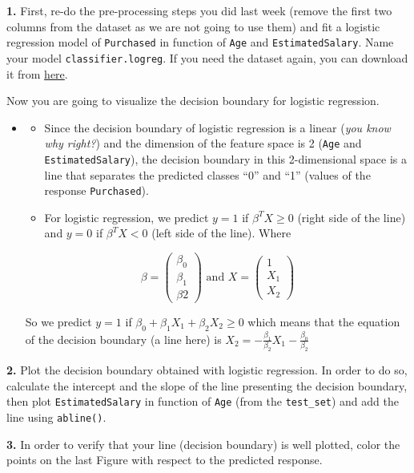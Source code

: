 \documentclass[]{book}
\providecommand{\tightlist}{%
  \setlength{\itemsep}{0pt}\setlength{\parskip}{0pt}}
\newenvironment{rmdblock}[1]
  {\begin{shaded*}
  \begin{itemize}
  \renewcommand{\labelitemi}{
    \raisebox{-.7\height}[0pt][0pt]{
      {\setkeys{Gin}{width=2em,keepaspectratio}\texttt{[image: img/icons/\#1]}}
    }
  }
  \item
  }
  {
  \end{itemize}
  \end{shaded*}
  }
\newenvironment{rmdinsight}
  {\begin{rmdblock}{insight}}
  {\end{rmdblock}}
\begin{document}
\textbf{1.} First, re-do the pre-processing steps you did last week
(remove the first two columns from the dataset as we are not going to
use them) and fit a logistic regression model of \texttt{Purchased} in
function of \texttt{Age} and \texttt{EstimatedSalary}. Name your model
\texttt{classifier.logreg}. If you need the dataset again, you can
download it from \href{datasets/Social_Network_Ads.csv}{here}.

Now you are going to visualize the decision boundary for logistic
regression.

\begin{rmdinsight}
\begin{itemize}
\tightlist
\item
  Since the decision boundary of logistic regression is a linear
  (\emph{you know why right?}) and the dimension of the feature space is
  2 (\texttt{Age} and \texttt{EstimatedSalary}), the decision boundary
  in this 2-dimensional space is a line that separates the predicted
  classes ``0'' and ``1'' (values of the response \texttt{Purchased}).
\item
  For logistic regression, we predict \(y=1\) if \(\beta^T X \geq 0\)
  (right side of the line) and \(y=0\) if \(\beta^T X < 0\) (left side
  of the line). Where
\end{itemize}

\[ \beta = \begin{pmatrix} \beta_0 \\ \beta_1 \\ \beta2 \end{pmatrix} \,\, \text{and} \,\, X = \begin{pmatrix}
  1 \\
  X_1 \\
  X_2
  \end{pmatrix}\]

So we predict \(y=1\) if \(\beta_0 + \beta_1 X_1 + \beta_2 X_2 \geq 0\)
which means that the equation of the decision boundary (a line here) is
\(X_2 = - \frac{\beta_1}{\beta_2}X_1 - \frac{\beta_0}{\beta_2}\)
\end{rmdinsight}

\textbf{2.} Plot the decision boundary obtained with logistic
regression. In order to do so, calculate the intercept and the slope of
the line presenting the decision boundary, then plot
\texttt{EstimatedSalary} in function of \texttt{Age} (from the
\texttt{test\_set}) and add the line using \texttt{abline()}.

\textbf{3.} In order to verify that your line (decision boundary) is
well plotted, color the points on the last Figure with respect to the
predicted response.
\end{document}
